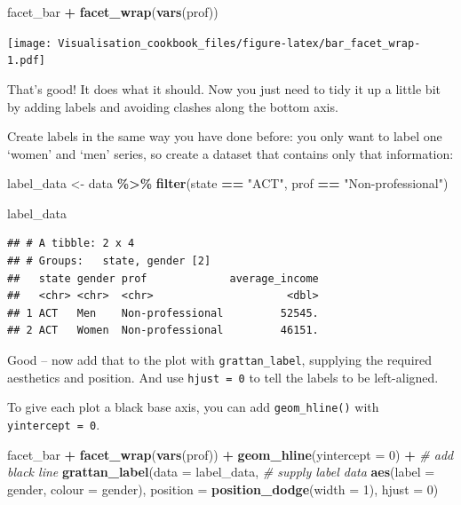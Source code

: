 \documentclass[
]{book}
\newenvironment{Shaded}{\begin{snugshade}}{\end{snugshade}}
\newcommand{\CommentTok}[1]{\textcolor[rgb]{0.56,0.35,0.01}{\textit{#1}}}
\newcommand{\DataTypeTok}[1]{\textcolor[rgb]{0.13,0.29,0.53}{#1}}
\newcommand{\DecValTok}[1]{\textcolor[rgb]{0.00,0.00,0.81}{#1}}
\newcommand{\KeywordTok}[1]{\textcolor[rgb]{0.13,0.29,0.53}{\textbf{#1}}}
\newcommand{\NormalTok}[1]{#1}
\newcommand{\OperatorTok}[1]{\textcolor[rgb]{0.81,0.36,0.00}{\textbf{#1}}}
\newcommand{\StringTok}[1]{\textcolor[rgb]{0.31,0.60,0.02}{#1}}
\begin{document}
\begin{Shaded}
\begin{Highlighting}[]
\NormalTok{facet\_bar }\OperatorTok{+}
\StringTok{  }\KeywordTok{facet\_wrap}\NormalTok{(}\KeywordTok{vars}\NormalTok{(prof))}
\end{Highlighting}
\end{Shaded}

\texttt{[image: Visualisation\_cookbook\_files/figure-latex/bar\_facet\_wrap-1.pdf]}

That's good! It does what it should. Now you just need to tidy it up a little bit by adding labels and avoiding clashes along the bottom axis.

Create labels in the same way you have done before: you only want to label one `women' and `men' series, so create a dataset that contains only that information:

\begin{Shaded}
\begin{Highlighting}[]
\NormalTok{label\_data \textless{}{-}}\StringTok{ }\NormalTok{data }\OperatorTok{\%\textgreater{}\%}\StringTok{ }
\StringTok{  }\KeywordTok{filter}\NormalTok{(state }\OperatorTok{==}\StringTok{ "ACT"}\NormalTok{,}
\NormalTok{         prof }\OperatorTok{==}\StringTok{ "Non{-}professional"}\NormalTok{)}

\NormalTok{label\_data}
\end{Highlighting}
\end{Shaded}

\begin{verbatim}
## # A tibble: 2 x 4
## # Groups:   state, gender [2]
##   state gender prof             average_income
##   <chr> <chr>  <chr>                     <dbl>
## 1 ACT   Men    Non-professional         52545.
## 2 ACT   Women  Non-professional         46151.
\end{verbatim}

Good -- now add that to the plot with \texttt{grattan\_label}, supplying the required aesthetics and position. And use \texttt{hjust\ =\ 0} to tell the labels to be left-aligned.

To give each plot a black base axis, you can add \texttt{geom\_hline()} with \texttt{yintercept\ =\ 0}.

\begin{Shaded}
\begin{Highlighting}[]
\NormalTok{facet\_bar }\OperatorTok{+}
\StringTok{  }\KeywordTok{facet\_wrap}\NormalTok{(}\KeywordTok{vars}\NormalTok{(prof)) }\OperatorTok{+}\StringTok{ }
\StringTok{  }\KeywordTok{geom\_hline}\NormalTok{(}\DataTypeTok{yintercept =} \DecValTok{0}\NormalTok{) }\OperatorTok{+}\StringTok{  }\CommentTok{\# add black line}
\StringTok{  }\KeywordTok{grattan\_label}\NormalTok{(}\DataTypeTok{data =}\NormalTok{ label\_data, }\CommentTok{\# supply label data}
                \KeywordTok{aes}\NormalTok{(}\DataTypeTok{label =}\NormalTok{ gender,}
                    \DataTypeTok{colour =}\NormalTok{ gender),}
                \DataTypeTok{position =} \KeywordTok{position\_dodge}\NormalTok{(}\DataTypeTok{width =} \DecValTok{1}\NormalTok{), }
                \DataTypeTok{hjust =} \DecValTok{0}\NormalTok{)}
\end{Highlighting}
\end{Shaded}
\end{document}
